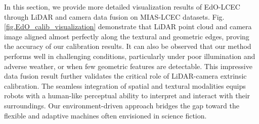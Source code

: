 In this section, we provide more detailed visualization results of EdO-LCEC through LiDAR and camera data fusion on MIAS-LCEC datasets. Fig. \ref{fig.EdO_calib_visualization} demonstrate that LiDAR point cloud and camera image aligned almost perfectly along the textural and geometric edges, proving the accuracy of our calibration results. It can also be observed that our method performs well in challenging conditions, particularly under poor illumination and adverse weather, or when few geometric features are detectable. This impressive data fusion result further validates the critical role of LiDAR-camera extrinsic calibration. The seamless integration of spatial and textural modalities equips robots with a human-like perceptual ability to interpret and interact with their surroundings. Our environment-driven approach bridges the gap toward the flexible and adaptive machines often envisioned in science fiction.